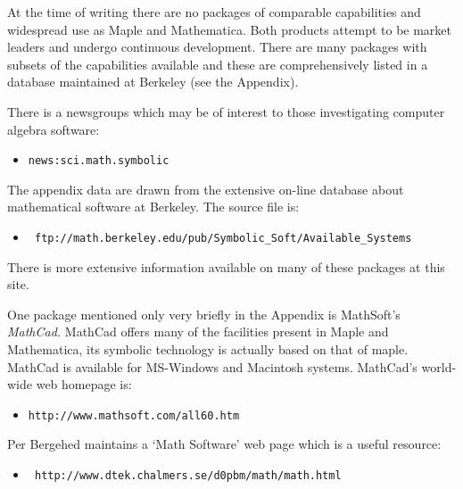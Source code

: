 \documentclass[twoside,11pt]{article}
\newcommand{\htmladdnormallink}[2]{#1}
\newcommand{\htmlref}[2]{#1}
\newcommand{\sgspec}[2]{#1}
\newcommand{\sgspec}[2]{#2}
\begin{document}
At the time of writing there are no packages of comparable capabilities and
widespread use as Maple and Mathematica.
Both products attempt to be market leaders and undergo continuous development.
There are many packages with subsets of the capabilities available and these
are comprehensively listed in a database maintained at Berkeley (see the
\htmlref{Appendix}{se_packages}).

There is a newsgroups which may be of interest to those investigating
computer algebra software:

\begin{itemize}

\item \htmladdnormallink{{\tt news:sci.math.symbolic}}{sci.math.symbolic}

\end{itemize}

The appendix data are drawn from the extensive on-line database about
mathematical software at Berkeley.  The source file is:

\begin{itemize}

\item \htmladdnormallink{\tt
        ftp://math.berkeley.edu/pub/Symbolic\_Soft/Available\_Systems}
       {ftp://math.berkeley.edu/pub/Symbolic_Soft/Available_Systems}

\end{itemize}

There is more extensive information available on many of these packages
at this site.

One package mentioned only very briefly in the Appendix is MathSoft's
{\sl MathCad.}  MathCad offers many of the facilities present in Maple
and Mathematica, its symbolic technology is actually based on that of
maple.  MathCad is available for MS-Windows and Macintosh systems.
MathCad's world-wide web homepage is:

\begin{itemize}

\item \htmladdnormallink{\tt http://www.mathsoft.com/all60.htm}
       {http://www.mathsoft.com/all60.htm}

\end{itemize}

Per Bergehed maintains a `Math Software' web page which is a useful
resource:

\begin{itemize}

\item \sgspec{{\tt
       http://www.dtek.chalmers.se/d0pbm/math/math.html}}
       {\htmladdnormallink{
       \verb+http://www.dtek.chalmers.se/~d0pbm/math/math.html+}
       {http://www.dtek.chalmers.se/\~{}d0pbm/math/math.html}}

\end{itemize}
\end{document}

